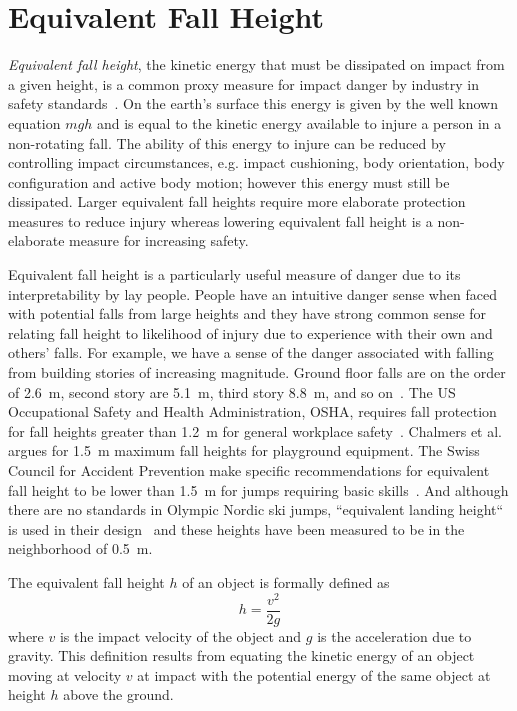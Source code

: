 \documentclass[smallextended]{svjour3}       %
\begin{document}
\section{Equivalent Fall Height}
\label{sec:efh}
%
\emph{Equivalent fall height}, the kinetic energy that must be dissipated on
impact from a given height, is a common proxy measure for impact danger by
industry in safety standards~\cite{Hubbard2012}. On the earth's surface this
energy is given by the well known equation $mgh$ and is equal to the kinetic
energy available to injure a person in a non-rotating fall. The ability of this
energy to injure can be reduced by controlling impact circumstances, e.g.
impact cushioning, body orientation, body configuration and active body motion;
however this energy must still be dissipated. Larger equivalent fall heights
require more elaborate protection measures to reduce injury whereas lowering
equivalent fall height is a non-elaborate measure for increasing safety.

Equivalent fall height is a particularly useful measure of danger due to its
interpretability by lay people. People have an intuitive danger sense when
faced with potential falls from large heights and they have strong common sense
for relating fall height to likelihood of injury due to experience with their
own and others' falls. For example, we have a sense of the danger associated
with falling from building stories of increasing magnitude. Ground floor falls
are on the order of 2.6~\si{\meter}, second story are 5.1~\si{\meter}, third
story 8.8~\si{\meter}, and so on~\cite{Vish2005}. The US Occupational Safety
and Health Administration, OSHA, requires fall protection for fall heights
greater than 1.2~\si{\meter} for general workplace safety~\cite{OSHA2021}.
Chalmers et al.~\cite{Chalmers1996} argues for 1.5~\si{\meter} maximum fall
heights for playground equipment. The Swiss Council for Accident Prevention
make specific recommendations for equivalent fall height to be lower than
1.5~\si{\meter} for jumps requiring basic skills~\cite{Heer2019}. And although
there are no standards in Olympic Nordic ski jumps, ``equivalent landing
height`` is used in their design~\cite{Gasser2018} and these heights have been
measured to be in the neighborhood of 0.5~\si{\meter}.

The equivalent fall height $h$ of an object is formally defined as
%
\begin{equation} h = \frac{v^2}{2g} \label{eq:efh_general} \end{equation}
%
where $v$ is the impact velocity of the object and $g$ is the acceleration due
to gravity. This definition results from equating the kinetic energy of an
object moving at velocity $v$ at impact with the potential energy of the same
object at height $h$ above the ground.
\end{document}
